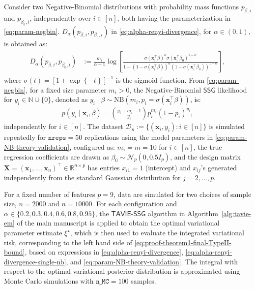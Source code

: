 \documentclass[12pt]{article}
\numberwithin{equation}{section}
\newcommand{\tssg}{\mathsf{TAVIE}\text{-}\mathsf{SSG}}
\begin{document}
Consider two Negative-Binomial distributions with probability mass functions $p_{\beta, i}$ and $p_{\beta_0, i}$, independently over $i\in [n]$, both having the parameterization in \eqref{eq:param-negbin}. $D_{\alpha}(p_{\beta, i}, p_{\beta_0, i})$ in \eqref{eq:alpha-renyi-divergence}, for $\alpha \in (0,1)$, is obtained as:
\begin{align}\label{eq:alpha-renyi-divergence-single-nb}
    \begin{split}
        D_{\alpha}(p_{\beta, i}, p_{\beta_0, i}) &:= \frac{m_i}{\alpha-1}\log \left[\frac{\sigma(\mathbf{x}_i^{\top}\beta)^{\alpha}\sigma(\mathbf{x}_i^{\top}\beta_0)^{1-\alpha}}{1 - (1 - \sigma(\mathbf{x}_i^{\top}\beta))^{\alpha}(1 - \sigma(\mathbf{x}_i^{\top}\beta_0))^{1-\alpha}}\right],
    \end{split}
\end{align}
where $\sigma(t) = [1 + \exp\left\{-t\right\}]^{-1}$ is the sigmoid function. From \eqref{eq:param-negbin}, for a fixed size parameter $m_i > 0$, the Negative-Binomial $\mathsf{SSG}$ likelihood for $y_i\in \mathbb{N} \cup \{0\}$, denoted as $y_i\mid \beta \sim \mathrm{NB}(m_i, p_i = \sigma(\mathbf{x}_i^{\top}\beta))$, is:
\begin{align}\label{eq:param-NB-theory-validation}
    p(y_i\mid \mathbf{x}_i, \beta) = \binom{y_i + m_i - 1}{y_i}p_i^{m_i}(1-p_i)^{y_i},
\end{align}
independently for $i\in [n]$. The dataset $\mathcal{D}_n := \{(\mathbf{x}_i, y_i): i\in [n]\}$ is simulated repeatedly for $\texttt{nreps}=50$ replications using the model parameters in \eqref{eq:param-NB-theory-validation}, configured as: $m_i = m = 10$ for $i \in [n]$, the true regression coefficients are drawn as $\beta_0 \sim \mathcal{N}_{p}(0, 0.5 I_{p})$, and the design matrix $\mathbf{X} = (\mathbf{x}_1, \ldots, \mathbf{x}_n)^{\top} \in \mathbb{R}^{n\times p}$ has entries $x_{i1}=1$ (intercept) and $x_{ij}$'s generated independently from the standard Gaussian distribution for $j=2, \ldots, p$.

For a fixed number of features $p=9$, data are simulated for two choices of sample size, $n=2000$ and $n = 10000$. For each configuration and $\alpha \in \{0.2, 0.3, 0.4, 0.6, 0.8, 0.95\}$, the $\tssg$ algorithm in Algorithm~\ref{alg:tavie-em} of the main manuscript is applied to obtain the optimal variational parameter estimate $\xi^{\star}$, which is then used to evaluate the integrated variational risk, corresponding to the left hand side of \eqref{eq:proof-theorem1-final-TypeII-bound}, based on expressions in \eqref{eq:alpha-renyi-divergence}, \eqref{eq:alpha-renyi-divergence-single-nb}, and  \eqref{eq:param-NB-theory-validation}. The integral with respect to the optimal variational posterior distribution is approximated using Monte Carlo simulations with $\texttt{n\_MC} = 100$ samples.
\end{document}
